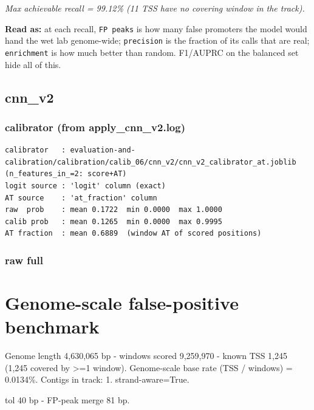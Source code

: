 \documentclass[10pt]{article}
\begin{document}
{\itshape Max achievable recall = 99.12\% (11 TSS have no covering window in the track).}

\textbf{Read as:} at each recall, \texttt{FP peaks} is how many false promoters the model would hand the wet lab genome-wide; \texttt{precision} is the fraction of its calls that are real; \texttt{enrichment} is how much better than random. F1/AUPRC on the balanced set hide all of this.

\subsection*{cnn\_v2}

\subsubsection*{calibrator (from apply\_cnn\_v2.log)}
\begin{verbatim}
calibrator   : evaluation-and-calibration/calibration/calib_06/cnn_v2/cnn_v2_calibrator_at.joblib  (n_features_in_=2: score+AT)
logit source : 'logit' column (exact)
AT source    : 'at_fraction' column
raw  prob    : mean 0.1722  min 0.0000  max 1.0000
calib prob   : mean 0.1265  min 0.0000  max 0.9995
AT fraction  : mean 0.6889  (window AT of scored positions)
\end{verbatim}

\subsubsection*{raw \textperiodcentered{} full}
\section*{Genome-scale false-positive benchmark}

Genome length 4,630,065 bp - windows scored 9,259,970 - known TSS 1,245 (1,245 covered by >=1 window). Genome-scale base rate (TSS / windows) = 0.0134\%. Contigs in track: 1. strand-aware=True.

tol 40 bp - FP-peak merge 81 bp.

\begin{center}
\end{center}
\end{document}
